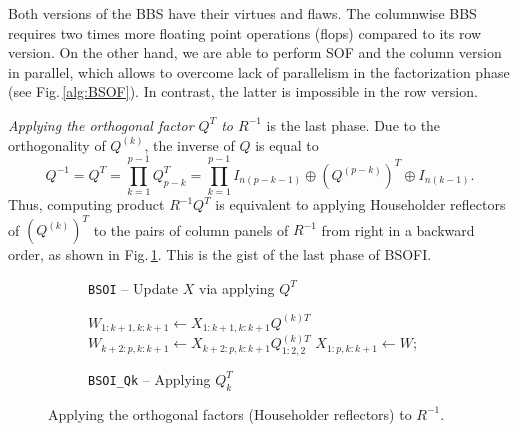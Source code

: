 \documentclass{llncs}
\begin{document}
Both versions of the BBS have their virtues and flaws. 
The columnwise BBS requires 
two times more floating point operations (flops) compared to 
its row version.  On the other hand, 
we are able to perform SOF and the column version in parallel, 
which allows to overcome lack of parallelism 
in the factorization phase (see Fig.\,\ref{alg:BSOF}).
In contrast, 
the latter is impossible in the row version. %

\textit{Applying the orthogonal factor $Q^T$ to $R^{-1}$} 
is the last phase.
Due to the orthogonality of $Q^{(k)}$, the inverse of $Q$ is equal to 
\begin{equation}
  Q^{-1} = Q^{T} = \prod_{k=1}^{p-1} Q_{p-k}^{T} = 
  \prod_{k=1}^{p-1} I_{n(p-k-1)}\oplus \left(Q^{(p-k)}\right)^{T} \oplus 
  I_{n(k-1)}.
\end{equation}
Thus, computing product $R^{-1} Q^{T}$ is equivalent to
applying Householder reflectors of $\left(Q^{(k)}\right)^{T}$ to 
the pairs of column panels of $R^{-1}$ from right in a backward order, 
as shown in Fig.\,\ref{alg:BSOI_Cycle}. 
This is the gist of the last phase of BSOFI.
\begin{figure}[t]%
  \centering
  \begin{subfigure}[t]{0.49\linewidth}%
    \begin{algorithm}[H]
      \BlankLine

      \BlankLine%
    \end{algorithm}    
    \caption{{\tt BSOI} -- Update $X$ via applying $Q^{T}$
      \label{alg:BSOI_Cycle}}
  \end{subfigure}
  \hfill
  \begin{subfigure}[t]{0.5\linewidth}%
    \begin{algorithm}[H]

      $W_{1:k+1,k:k+1} \gets X_{1:k+1,k:k+1} Q^{(k)T} $\;
      $W_{k+2:p,k:k+1} \gets X_{k+2:p,k:k+1} Q_{1:2,2}^{(k)T}$\;
      $X_{1:p,k:k+1} \gets W$;
    \end{algorithm}    
    \caption{{\tt BSOI\_Qk} -- Applying $Q_k^{T}$
      \label{alg:BSOI_Qk}}
  \end{subfigure}
  \caption{Applying the orthogonal factors (Householder reflectors) to $R^{-1}$.
    \label{alg:BSOI}}
\end{figure}
\end{document}
